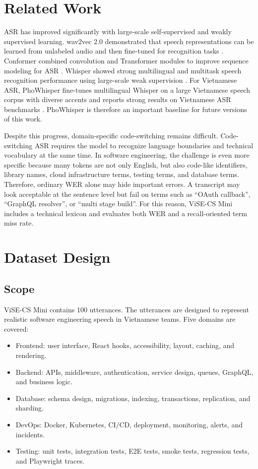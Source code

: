 \documentclass[conference]{IEEEtran}
\begin{document}
\section{Related Work}
ASR has improved significantly with large-scale self-supervised and weakly supervised learning. wav2vec 2.0 demonstrated that speech representations can be learned from unlabeled audio and then fine-tuned for recognition tasks \cite{b1}. Conformer combined convolution and Transformer modules to improve sequence modeling for ASR \cite{b2}. Whisper showed strong multilingual and multitask speech recognition performance using large-scale weak supervision \cite{b3}. For Vietnamese ASR, PhoWhisper fine-tunes multilingual Whisper on a large Vietnamese speech corpus with diverse accents and reports strong results on Vietnamese ASR benchmarks \cite{b4}. PhoWhisper is therefore an important baseline for future versions of this work.

Despite this progress, domain-specific code-switching remains difficult. Code-switching ASR requires the model to recognize language boundaries and technical vocabulary at the same time. In software engineering, the challenge is even more specific because many tokens are not only English, but also code-like identifiers, library names, cloud infrastructure terms, testing terms, and database terms. Therefore, ordinary WER alone may hide important errors. A transcript may look acceptable at the sentence level but fail on terms such as ``OAuth callback'', ``GraphQL resolver'', or ``multi stage build''. For this reason, ViSE-CS Mini includes a technical lexicon and evaluates both WER and a recall-oriented term miss rate.

\section{Dataset Design}
\subsection{Scope}
ViSE-CS Mini contains 100 utterances. The utterances are designed to represent realistic software engineering speech in Vietnamese teams. Five domains are covered:
\begin{itemize}
\item Frontend: user interface, React hooks, accessibility, layout, caching, and rendering.
\item Backend: APIs, middleware, authentication, service design, queues, GraphQL, and business logic.
\item Database: schema design, migrations, indexing, transactions, replication, and sharding.
\item DevOps: Docker, Kubernetes, CI/CD, deployment, monitoring, alerts, and incidents.
\item Testing: unit tests, integration tests, E2E tests, smoke tests, regression tests, and Playwright traces.
\end{itemize}
\end{document}
